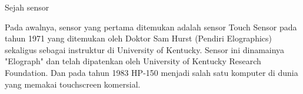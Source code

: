 Sejah sensor

Pada awalnya, sensor yang pertama ditemukan adalah sensor Touch Sensor pada tahun 1971 yang ditemukan oleh Doktor Sam Hurst
(Pendiri Elographics) sekaligus sebagai instruktur di University of Kentucky. Sensor ini dinamainya "Elograph"
dan telah dipatenkan oleh University of Kentucky Research Foundation. Dan pada tahun 1983 HP-150 menjadi salah satu komputer
di dunia yang memakai touchscreen komersial.